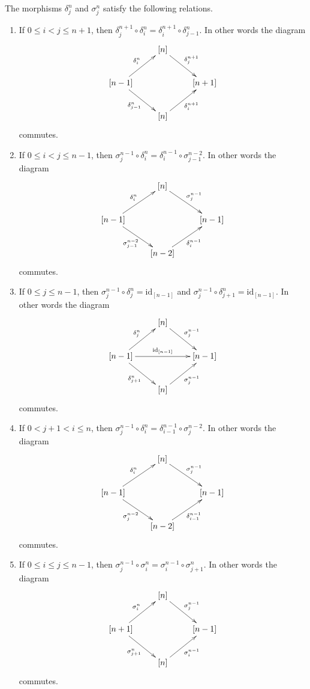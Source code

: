 \begin{lemma}
\label{lemma-relations-face-degeneracy}
The morphisms $\delta^n_j$ and $\sigma^n_j$ satisfy the following relations.
\begin{enumerate}
\item If $0 \leq i < j \leq n + 1$, then
$\delta^{n + 1}_j \circ \delta^n_i =
\delta^{n + 1}_i \circ \delta^n_{j - 1}$.
In other words the diagram
$$
\xymatrix{
& [n] \ar[rd]^{\delta^{n + 1}_j} & \\
[n - 1] \ar[ru]^{\delta^n_i} \ar[rd]_{\delta^n_{j - 1}} & &
[n + 1] \\
& [n] \ar[ru]_{\delta^{n + 1}_i} & 
}
$$
commutes.
\item If $0 \leq i < j \leq n - 1$, then
$\sigma^{n - 1}_j \circ \delta^n_i =
\delta^{n - 1}_i \circ \sigma^{n - 2}_{j - 1}$.
In other words the diagram
$$
\xymatrix{
& [n] \ar[rd]^{\sigma^{n - 1}_j} & \\
[n - 1] \ar[ru]^{\delta^n_i} \ar[rd]_{\sigma^{n - 2}_{j - 1}} & &
[n - 1] \\
& [n - 2] \ar[ru]_{\delta^{n - 1}_i} & 
}
$$
commutes.
\item If $0 \leq j \leq n - 1$, then
$\sigma^{n - 1}_j \circ \delta^n_j = \text{id}_{[n - 1]}$
and
$\sigma^{n - 1}_j \circ \delta^n_{j + 1} = \text{id}_{[n - 1]}$.
In other words the diagram
$$
\xymatrix{
& [n] \ar[rd]^{\sigma^{n - 1}_j} & \\
[n - 1]
\ar[ru]^{\delta^n_j}
\ar[rd]_{\delta^n_{j + 1}}
\ar[rr]^{\text{id}_{[n - 1]}} & & [n - 1] \\
& [n] \ar[ru]_{\sigma^{n - 1}_j} &
}
$$
commutes.
\item If $0 < j + 1 < i \leq n$, then
$\sigma^{n - 1}_j \circ \delta^n_i =
\delta^{n - 1}_{i - 1} \circ \sigma^{n - 2}_j$.
In other words the diagram
$$
\xymatrix{
& [n] \ar[rd]^{\sigma^{n - 1}_j} & \\
[n - 1] \ar[ru]^{\delta^n_i} \ar[rd]_{\sigma^{n - 2}_j} & &
[n - 1] \\
& [n - 2] \ar[ru]_{\delta^{n - 1}_{i - 1}} & 
}
$$
commutes.
\item If $0 \leq i \leq j \leq n - 1$, then
$\sigma^{n - 1}_j \circ \sigma^n_i =
\sigma^{n - 1}_i \circ \sigma^n_{j + 1}$.
In other words the diagram
$$
\xymatrix{
& [n] \ar[rd]^{\sigma^{n - 1}_j} & \\
[n + 1] \ar[ru]^{\sigma^n_i} \ar[rd]_{\sigma^n_{j + 1}} & &
[n - 1] \\
& [n] \ar[ru]_{\sigma^{n - 1}_i} & 
}
$$
commutes.
\end{enumerate}
\end{lemma}

